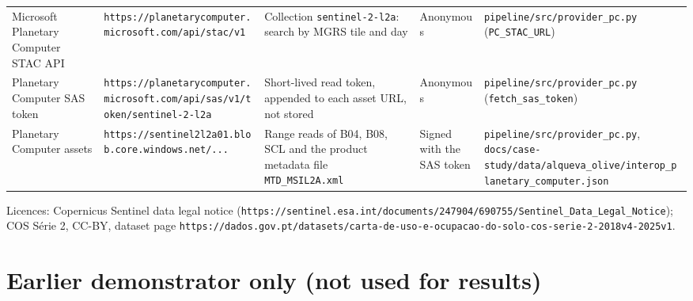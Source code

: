 {\begin{longtable}{>{\raggedright\arraybackslash}p{1.99cm}>{\raggedright\arraybackslash}p{3.22cm}>{\raggedright\arraybackslash}p{3.22cm}>{\raggedright\arraybackslash}p{1.34cm}>{\raggedright\arraybackslash}p{3.22cm}}
Microsoft Planetary Computer STAC API & \texttt{https:/\allowbreak{}/\allowbreak{}planetarycomputer.microsoft.com/\allowbreak{}api/\allowbreak{}stac/\allowbreak{}v1} & Collection \texttt{sentinel-2-l2a}: search by MGRS tile and day & Anonymous & \texttt{pipeline/\allowbreak{}src/\allowbreak{}provider\_pc.py} (\texttt{PC\_STAC\_URL}) \\
Planetary Computer SAS token & \texttt{https:/\allowbreak{}/\allowbreak{}planetarycomputer.microsoft.com/\allowbreak{}api/\allowbreak{}sas/\allowbreak{}v1/\allowbreak{}token/\allowbreak{}sentinel-2-l2a} & Short-lived read token, appended to each asset URL, not stored & Anonymous & \texttt{pipeline/\allowbreak{}src/\allowbreak{}provider\_pc.py} (\texttt{fetch\_sas\_token}) \\
Planetary Computer assets & \texttt{https:/\allowbreak{}/\allowbreak{}sentinel2l2a01.blob.core.windows.net/\allowbreak{}...} & Range reads of B04, B08, SCL and the product metadata file \texttt{MTD\_MSIL2A.xml} & Signed with the SAS token & \texttt{pipeline/\allowbreak{}src/\allowbreak{}provider\_pc.py}, \texttt{docs/\allowbreak{}case-study/\allowbreak{}data/\allowbreak{}alqueva\_olive/\allowbreak{}interop\_planetary\_computer.json} \\
\bottomrule
\end{longtable}
}

Licences: Copernicus Sentinel data legal notice (\texttt{https:/\allowbreak{}/\allowbreak{}sentinel.esa.int/\allowbreak{}documents/\allowbreak{}247904/\allowbreak{}690755/\allowbreak{}Sentinel\_Data\_Legal\_Notice}); COS Série 2, CC-BY, dataset page \texttt{https:/\allowbreak{}/\allowbreak{}dados.gov.pt/\allowbreak{}datasets/\allowbreak{}carta-de-uso-e-ocupacao-do-solo-cos-serie-2-2018v4-2025v1}.

\section{Earlier demonstrator only (not used for results)}


